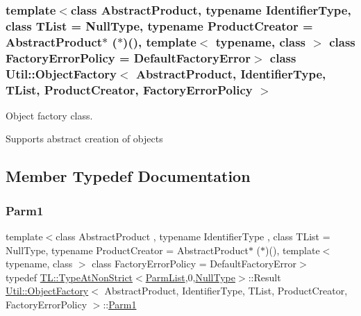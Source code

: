 \subsubsection*{template$<$class Abstract\+Product, typename Identifier\+Type, class T\+List = Null\+Type, typename Product\+Creator = Abstract\+Product$\ast$ ($\ast$)(), template$<$ typename, class $>$ class Factory\+Error\+Policy = Default\+Factory\+Error$>$\newline
class Util\+::\+Object\+Factory$<$ Abstract\+Product, Identifier\+Type, T\+List, Product\+Creator, Factory\+Error\+Policy $>$}

Object factory class. 

Supports abstract creation of objects 

\subsection{Member Typedef Documentation}
\mbox{\label{classUtil_1_1ObjectFactory_a47e4f863537be7a4f5f5972691bb0b57}} 
\subsubsection{\texorpdfstring{Parm1}{Parm1}\hspace{0.1cm}{\footnotesize\ttfamily [1/2]}}
{\footnotesize\ttfamily template$<$class Abstract\+Product , typename Identifier\+Type , class T\+List  = Null\+Type, typename Product\+Creator  = Abstract\+Product$\ast$ ($\ast$)(), template$<$ typename, class $>$ class Factory\+Error\+Policy = Default\+Factory\+Error$>$ \\
typedef \mbox{\hyperlink{structUtil_1_1TL_1_1TypeAtNonStrict}{T\+L\+::\+Type\+At\+Non\+Strict}}$<$\mbox{\hyperlink{classUtil_1_1ObjectFactory_a46f003a5928e8a60140e0a74ac261c36}{Parm\+List}},0,\mbox{\hyperlink{classUtil_1_1NullType}{Null\+Type}}$>$\+::Result \mbox{\hyperlink{classUtil_1_1ObjectFactory}{Util\+::\+Object\+Factory}}$<$ Abstract\+Product, Identifier\+Type, T\+List, Product\+Creator, Factory\+Error\+Policy $>$\+::\mbox{\hyperlink{classUtil_1_1ObjectFactory_a47e4f863537be7a4f5f5972691bb0b57}{Parm1}}}

